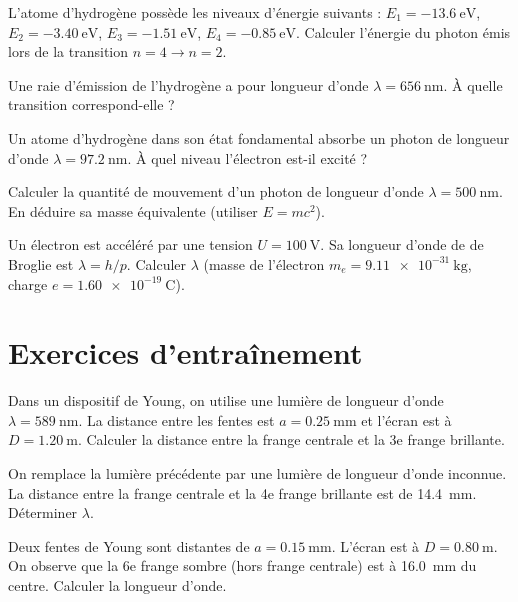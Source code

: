 
\exo{}
L'atome d'hydrogène possède les niveaux d'énergie suivants : \(E_1 = \SI{-13.6}{\electronvolt}\), \(E_2 = \SI{-3.40}{\electronvolt}\), \(E_3 = \SI{-1.51}{\electronvolt}\), \(E_4 = \SI{-0.85}{\electronvolt}\). Calculer l'énergie du photon émis lors de la transition \(n=4 \to n=2\).

\exo{}
Une raie d'émission de l'hydrogène a pour longueur d'onde \(\lambda = \SI{656}{\nano\metre}\). À quelle transition correspond-elle ?

\exo{}
Un atome d'hydrogène dans son état fondamental absorbe un photon de longueur d'onde \(\lambda = \SI{97.2}{\nano\metre}\). À quel niveau l'électron est-il excité ?


\exo{}
Calculer la quantité de mouvement d'un photon de longueur d'onde \(\lambda = \SI{500}{\nano\metre}\). En déduire sa masse équivalente (utiliser \(E = m c^2\)).

\exo{}
Un électron est accéléré par une tension \(U = \SI{100}{\volt}\). Sa longueur d'onde de de Broglie est \(\lambda = h / p\). Calculer \(\lambda\) (masse de l'électron \(m_e = \SI{9.11e-31}{\kilogram}\), charge \(e = \SI{1.60e-19}{\coulomb}\)).

\section{Exercices d'entraînement}


\exo{}
Dans un dispositif de Young, on utilise une lumière de longueur d'onde \(\lambda = \SI{589}{\nano\metre}\). La distance entre les fentes est \(a = \SI{0.25}{\milli\metre}\) et l'écran est à \(D = \SI{1.20}{\metre}\). Calculer la distance entre la frange centrale et la 3e frange brillante.

\exo{}
On remplace la lumière précédente par une lumière de longueur d'onde inconnue. La distance entre la frange centrale et la 4e frange brillante est de \SI{14.4}{\milli\metre}. Déterminer \(\lambda\).

\exo{}
Deux fentes de Young sont distantes de \(a = \SI{0.15}{\milli\metre}\). L'écran est à \(D = \SI{0.80}{\metre}\). On observe que la 6e frange sombre (hors frange centrale) est à \SI{16.0}{\milli\metre} du centre. Calculer la longueur d'onde.

